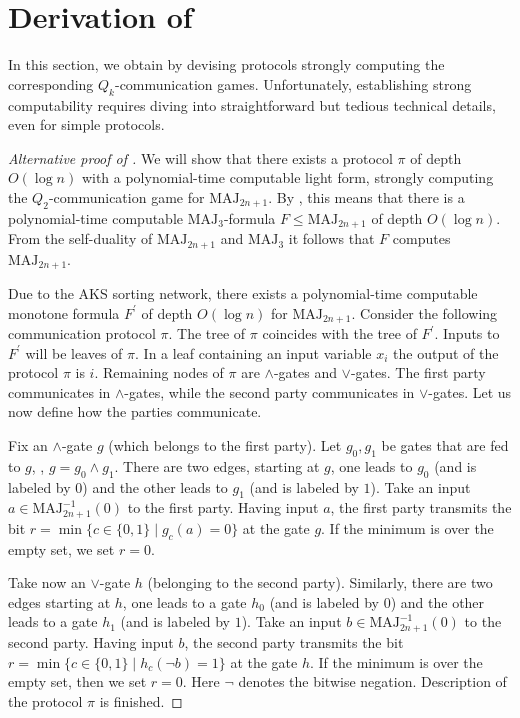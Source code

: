 \documentclass{toc}
\def\MAJ{\mathrm{MAJ}}
\begin{document}
\section{Derivation of  } \label{sec:corol}

In this section, we obtain   by devising protocols  strongly computing the corresponding $Q_k$-communication games. Unfortunately, establishing strong computability requires diving into straightforward but tedious technical details, even for simple protocols.  

\begin{proof}[Alternative proof of ]
 We will show that there exists 
%
a protocol $\pi$ of depth $O(\log n)$  %
with a polynomial-time computable light form, strongly computing the $Q_2$-communication game for $\MAJ_{2n + 1}$. By , this means that there is a polynomial-time computable 
%
$\MAJ_3$-formula $F \le \MAJ_{2n + 1}$ 
of depth $O(\log n)$.
{}From the self-duality of $\MAJ_{2n + 1}$ and $\MAJ_3$ it follows that $F$ computes $\MAJ_{2n + 1}$. 

Due to the AKS sorting network, there exists a polynomial-time computable 
%
monotone formula $F^\prime$
of depth $O(\log n)$  %
for $\MAJ_{2n  + 1}$. Consider the following communication protocol $\pi$.
The tree of $\pi$ coincides with the tree of $F^\prime$. Inputs to $F^\prime$ will be leaves of $\pi$. In a leaf containing an input variable $x_i$ the output of the protocol $\pi$ is $i$. Remaining nodes of $\pi$ are $\land$-gates and $\lor$-gates. The first party communicates in $\land$-gates, while the second party communicates in $\lor$-gates. Let us now define how the parties communicate.

Fix an  $\land$-gate $g$ (which belongs to the first party). Let $g_0, g_1$ be gates that are fed to $g$, \ie, $g = g_0 \land g_1$. There are two edges, starting at $g$, one leads to $g_0$ (and is labeled by $0$) and the other leads to $g_1$ (and is labeled by $1$). Take an input $a\in \MAJ_{2n + 1}^{-1}(0)$ to the first party. Having  input $a$, the first party transmits the bit $r  = \min\{ c \in \{0, 1\} \mid g_c(a) = 0\}$  at the gate $g$. If the minimum is over the empty set, we set $r = 0$. 

Take now an $\lor$-gate $h$ (belonging to the second party). Similarly, there are two edges starting at $h$, one leads to a gate $h_0$ (and is labeled by $0$) and the other leads to a gate $h_1$ (and is labeled by $1$). Take an input $b\in \MAJ_{2n + 1}^{-1}(0)$ to the second party. Having input $b$, the second party transmits the bit $r  = \min\{ c \in \{0, 1\} \mid h_c(\lnot b) = 1\}$ at the gate $h$.  If the minimum is over the empty set, then we set $r = 0$. Here $\lnot$ denotes the %
bitwise  %
negation. Description of the protocol $\pi$ is finished.


\end{proof}
\end{document}
